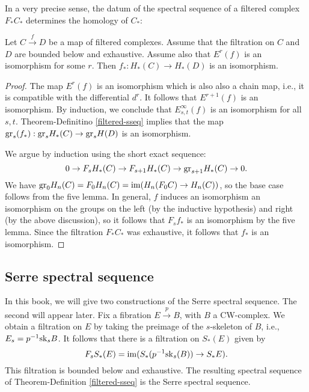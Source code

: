 %
In a very precise sense, the datum of the spectral sequence of a filtered
complex $F_\ast C_\ast$ determines the homology of $C_\ast$:
\begin{corollary}
    Let $C\xrightarrow{f} D$ be a map of filtered complexes.
    Assume that the filtration on $C$ and $D$ are bounded below and exhaustive.
    Assume also that $E^r(f)$ is an isomorphism for some $r$.
    Then $f_\ast : H_\ast(C) \to H_\ast(D)$ is an isomorphism.
\end{corollary}
\begin{proof}
    The map $E^r(f)$ is an isomorphism which is also also a chain map, i.e., it
    is compatible with the differential $d^r$. It follows that $E^{r+1}(f)$ is
    an isomorphism. By induction, we conclude that $E^\infty_{s,t}(f)$ is an
    isomorphism for all $s,t$. Theorem-Definitino \ref{filtered-sseq} implies
    that the map $\mathrm{gr}_s(f_\ast):\mathrm{gr}_s H_\ast(C) \to \mathrm{gr}_s H(D)$ is an
    isomorphism.
    
    We argue by induction using the short exact sequence:
    $$
    0 \to F_s H_\ast(C) \to F_{s+1} H_\ast(C) \to \mathrm{gr}_{s+1} H_\ast(C) \to 0.
    $$
    We have $\mathrm{gr}_0 H_n(C) = F_0 H_n(C) = \operatorname{im}(H_n(F_0 C) \to H_n(C))$, so the
    base case follows from the five lemma. In general, $f$ induces an
    isomorphism an isomorphism on the groups on the left (by the inductive
    hypothesis) and right (by the above discussion), so it follows that $F_s
    f_\ast$ is an isomorphism by the five lemma. Since the filtration $F_\ast
    C_\ast$ was exhaustive, it follows that $f_\ast$ is an isomorphism.
\end{proof}
\subsection{Serre spectral sequence}\label{serre-sseq}
In this book, we will give two constructions of the Serre spectral sequence.
The second will appear later. Fix a fibration $E\xrightarrow{p} B$, with $B$ a
CW-complex. We obtain a filtration on $E$ by taking the preimage of the
$s$-skeleton of $B$, i.e., $E_s = p^{-1} \mathrm{sk}_s B$. It follows that there is a
filtration on $S_\ast(E)$ given by
$$F_s S_\ast (E) = \operatorname{im}(S_\ast(p^{-1} \mathrm{sk}_s(B)) \to S_\ast E).$$
This filtration is bounded below and exhaustive. The resulting spectral
sequence of Theorem-Definition \ref{filtered-sseq} is the Serre spectral
sequence.

